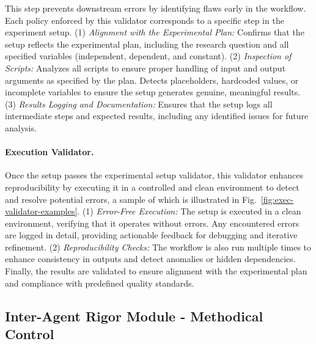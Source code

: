 This step prevents downstream errors by identifying flaws early in the workflow. 
Each policy enforced by this validator corresponds to a specific step in the experiment setup.
(1) \textit{Alignment with the Experimental Plan:}
Confirms that the setup reflects the experimental plan, including the research question and all specified variables (independent, dependent, and constant).
(2) \textit{Inspection of Scripts:}
Analyzes all scripts to ensure proper handling of input and output arguments as specified by the plan. Detects placeholders, hardcoded values, or incomplete variables to ensure the setup generates genuine, meaningful results.
(3) \textit{Results Logging and Documentation:}
Ensures that the setup logs all intermediate steps and expected results, including any identified issues for future analysis.
\fi

\paragraph{Execution Validator.}
Once the setup passes the experimental setup validator, this validator enhances reproducibility by executing it in a controlled and clean environment to detect and resolve potential errors, a sample of which is illustrated in Fig.~\ref{fig:exec-validator-examples}.
(1) \textit{Error-Free Execution:}
The setup is executed in a clean environment, verifying that it operates without errors. Any encountered errors are logged in detail, providing actionable feedback for debugging and iterative refinement.
(2) \textit{Reproducibility Checks:}
The workflow is also run multiple times to enhance consistency in outputs and detect anomalies or hidden dependencies. Finally, the results are validated to ensure alignment with the experimental plan and compliance with predefined quality standards.
 

\subsection{Inter-Agent Rigor Module - Methodical Control}
\label{subsec:inter-agent-primitive}

